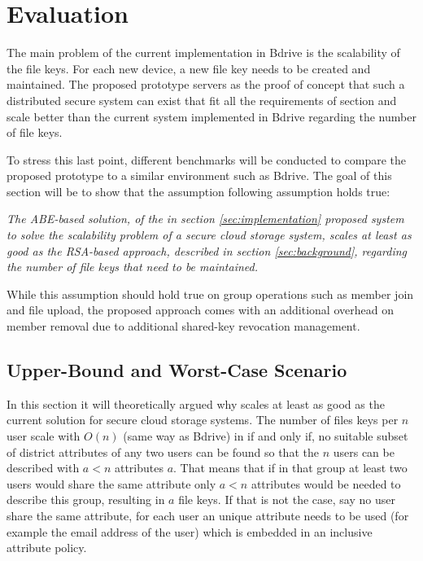 \chapter{Evaluation}

The main problem of the current implementation in Bdrive is the scalability of the file keys. For each new device, a new file key needs to be created and maintained. The proposed prototype servers as the proof of concept that such a distributed secure system can exist that fit all the requirements of section  and scale better than the current system implemented in Bdrive regarding the number of file keys. 

To stress this last point, different benchmarks will be conducted to compare the proposed prototype to a similar environment such as Bdrive. The goal of this section will be to show that the assumption following assumption holds true:

\begin{center}
\textit{The ABE-based solution, of the in section \ref{sec:implementation} proposed system to solve the scalability problem of a secure cloud storage system, scales at least as good as the RSA-based approach, described in section \ref{sec:background}, regarding the number of file keys that need to be maintained.}
\end{center}

While this assumption should hold true on group operations such as member join and file upload, the proposed approach comes with an additional overhead on member removal due to additional shared-key revocation management. 

\section{Upper-Bound and Worst-Case Scenario}
\label{sec:upper-bound-and-worst-case-scenario}
In this section it will theoretically argued why \name scales at least as good as the current solution for secure cloud storage systems. The number of files keys per $n$ user scale with $O(n)$ (same way as Bdrive) in \name if and only if, no suitable subset of district attributes of any two users can be found so that the $n$ users can be described with $a < n$ attributes $a$. 
That means that if in that group at least two users would share the same attribute only $a < n$ attributes would be needed to describe this group, resulting in $a$ file keys. 
If that is not the case, say no user share the same attribute, for each user an unique attribute needs to be used (for example the email address of the user) which is embedded in an inclusive attribute policy. 

